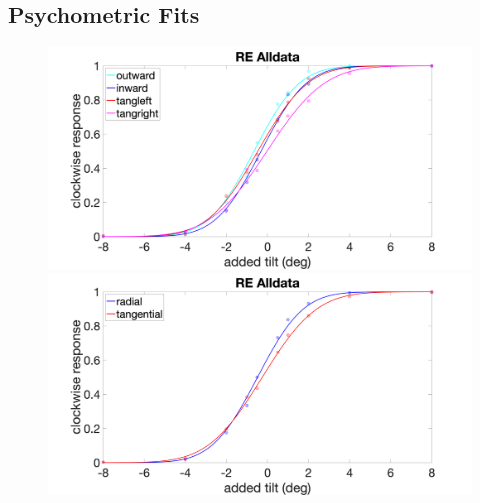 \documentclass[11pt]{article} %
\begin{document}
\subsection{Psychometric Fits}
\begin{figure}[H]
\centering %
\includegraphics[scale=.16]{Images/RE_PF_Alldata_4conds.png}
\includegraphics[scale=.16]{Images/RE_PF_Alldata_2conds.png}
\end{figure}
\end{document}
